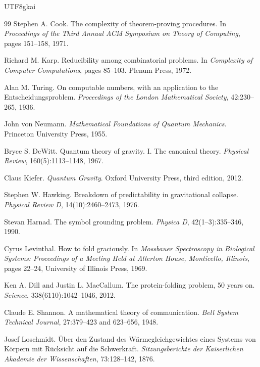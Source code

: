 \documentclass[12pt]{article}
\begin{document}
\begin{CJK*}{UTF8}{gkai}
\begin{thebibliography}{99}
Stephen A. Cook.
\newblock The complexity of theorem-proving procedures.
\newblock In \emph{Proceedings of the Third Annual ACM Symposium on Theory of Computing},
pages 151--158, 1971.

Richard M. Karp.
\newblock Reducibility among combinatorial problems.
\newblock In \emph{Complexity of Computer Computations}, pages 85--103.
\newblock Plenum Press, 1972.

Alan M. Turing.
\newblock On computable numbers, with an application to the Entscheidungsproblem.
\newblock \emph{Proceedings of the London Mathematical Society}, 42:230--265, 1936.

John von Neumann.
\newblock \emph{Mathematical Foundations of Quantum Mechanics}.
\newblock Princeton University Press, 1955.

Bryce S. DeWitt.
\newblock Quantum theory of gravity. I. The canonical theory.
\newblock \emph{Physical Review}, 160(5):1113--1148, 1967.

Claus Kiefer.
\newblock \emph{Quantum Gravity}.
\newblock Oxford University Press, third edition, 2012.

Stephen W. Hawking.
\newblock Breakdown of predictability in gravitational collapse.
\newblock \emph{Physical Review D}, 14(10):2460--2473, 1976.

Stevan Harnad.
\newblock The symbol grounding problem.
\newblock \emph{Physica D}, 42(1--3):335--346, 1990.

Cyrus Levinthal.
\newblock How to fold graciously.
\newblock In \emph{Mossbauer Spectroscopy in Biological Systems:
Proceedings of a Meeting Held at Allerton House, Monticello, Illinois},
pages 22--24, University of Illinois Press, 1969.

Ken A. Dill and Justin L. MacCallum.
\newblock The protein-folding problem, 50 years on.
\newblock \emph{Science}, 338(6110):1042--1046, 2012.

Claude E. Shannon.
\newblock A mathematical theory of communication.
\newblock \emph{Bell System Technical Journal}, 27:379--423 and 623--656, 1948.

Josef Loschmidt.
\newblock \"Uber den Zustand des W\"armegleichgewichtes eines Systems von K\"orpern mit R\"ucksicht auf die Schwerkraft.
\newblock \emph{Sitzungsberichte der Kaiserlichen Akademie der Wissenschaften}, 73:128--142, 1876.


\end{thebibliography}
\end{CJK*}
\end{document}
